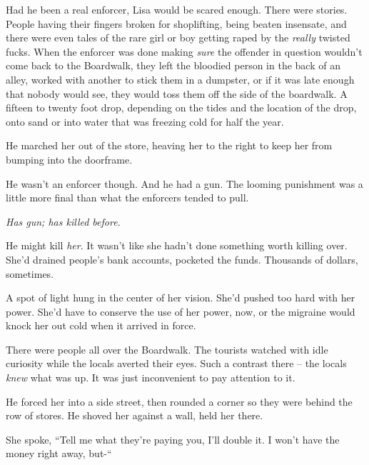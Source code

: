 Had he been a real enforcer, Lisa would be scared enough.  There were stories.  People having their fingers broken for shoplifting, being beaten insensate, and there were even tales of the rare girl or boy getting raped by the \emph{really} twisted fucks.  When the enforcer was done making \emph{sure} the offender in question wouldn't come back to the Boardwalk, they left the bloodied person in the back of an alley, worked with another to stick them in a dumpster, or if it was late enough that nobody would see, they would toss them off the side of the boardwalk.  A fifteen to twenty foot drop, depending on the tides and the location of the drop, onto sand or into water that was freezing cold for half the year.



He marched her out of the store, heaving her to the right to keep her from bumping into the doorframe.



He wasn't an enforcer though.  And he had a gun.  The looming punishment was a little more final than what the enforcers tended to pull.



\emph{Has gun; has killed before.}



He might kill \emph{her}.  It wasn't like she hadn't done something worth killing over.  She'd drained people's bank accounts, pocketed the funds.  Thousands of dollars, sometimes.



A spot of light hung in the center of her vision.  She'd pushed too hard with her power.  She'd have to conserve the use of her power, now, or the migraine would knock her out cold when it arrived in force.



There were people all over the Boardwalk.  The tourists watched with idle curiosity while the locals averted their eyes.  Such a contrast there – the locals \emph{knew} what was up.  It was just inconvenient to pay attention to it.



He forced her into a side street, then rounded a corner so they were behind the row of stores.  He shoved her against a wall, held her there.



She spoke, ``Tell me what they're paying you, I'll double it.  I won't have the money right away, but-``




